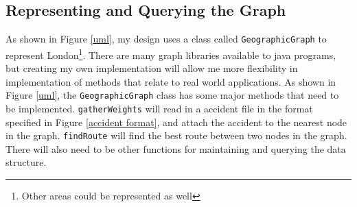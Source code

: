 \documentclass[11pt,twoside,a4paper]{report}
\begin{document}
\subsection{Representing and Querying the Graph}
As shown in Figure \ref{uml}, my design uses a class called \texttt{GeographicGraph} to represent London\footnote{Other areas could be represented as well}. There are many graph libraries available to java programs, but creating my own implementation
 will allow me more flexibility in implementation of methods that relate to real world applications. As shown in Figure \ref{uml}, the \texttt{GeographicGraph} class has some major methods that need to be implemented. \texttt{gatherWeights} will 
 read in a accident file in the format specified in Figure \ref{accident format}, and attach the accident to the nearest node in the graph. \texttt{findRoute} will find the best route between two nodes in the graph.
There will also need to be other functions for maintaining and querying the data structure.
\end{document}
